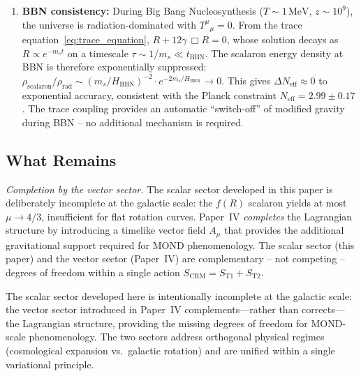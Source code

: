 \documentclass[aps,prd,twocolumn,superscriptaddress,nofootinbib]{revtex4-2}
\begin{document}
\begin{enumerate}
\item \textbf{BBN consistency:} During Big Bang Nucleosynthesis ($T \sim 1\,\mathrm{MeV}$, $z \sim 10^9$), the universe is radiation-dominated with $T^{\mu}{}_{\mu} = 0$. From the trace equation~\eqref{eq:trace_equation}, $R + 12\gamma\,\Box R = 0$, whose solution decays as $R \propto e^{-m_s t}$ on a timescale $\tau \sim 1/m_s \ll t_{\mathrm{BBN}}$. The scalaron energy density at BBN is therefore exponentially suppressed: $\rho_{\mathrm{scalaron}}/\rho_{\mathrm{rad}} \sim (m_s/H_{\mathrm{BBN}})^{-2} \cdot e^{-2m_s/H_{\mathrm{BBN}}} \to 0$. This gives $\Delta N_{\mathrm{eff}} \approx 0$ to exponential accuracy, consistent with the Planck constraint $N_{\mathrm{eff}} = 2.99 \pm 0.17$. The trace coupling provides an automatic ``switch-off'' of modified gravity during BBN -- no additional mechanism is required.
\end{enumerate}

\subsection{What Remains}

\textit{Completion by the vector sector.} The scalar sector developed in this paper is deliberately incomplete at the galactic scale: the $f(R)$ scalaron yields at most $\mu \to 4/3$, insufficient for flat rotation curves. Paper~IV \cite{Geiger2026d} \emph{completes} the Lagrangian structure by introducing a timelike vector field $A_\mu$ that provides the additional gravitational support required for MOND phenomenology. The scalar sector (this paper) and the vector sector (Paper~IV) are complementary -- not competing -- degrees of freedom within a single action $S_{\mathrm{CRM}} = S_{\mathrm{T1}} + S_{\mathrm{T2}}$.

The scalar sector developed here is intentionally incomplete at the galactic scale: the vector sector introduced in Paper~IV complements---rather than corrects---the Lagrangian structure, providing the missing degrees of freedom for MOND-scale phenomenology. The two sectors address orthogonal physical regimes (cosmological expansion vs.\ galactic rotation) and are unified within a single variational principle.
\end{document}
